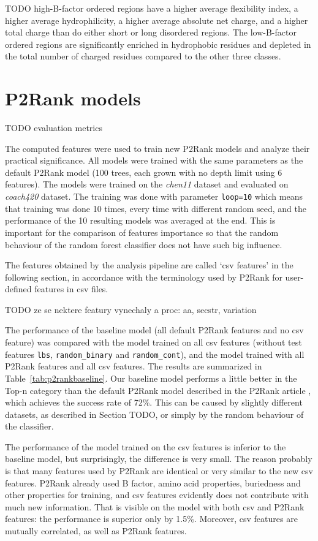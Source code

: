TODO high-B-factor ordered regions
have a higher average flexibility index, a higher average
hydrophilicity, a higher average absolute net charge, and a
higher total charge than do either short or long disordered
regions. The low-B-factor ordered regions are significantly
enriched in hydrophobic residues and depleted in the total
number of charged residues compared to the other three
classes. 




\section{P2Rank models}

TODO evaluation metrics

The computed features were used to train new P2Rank models and analyze their practical significance. All models were trained with the same parameters as the default P2Rank model (100 trees, each grown with no depth limit using 6 features). The models were trained on the \textit{chen11} dataset and evaluated on \textit{coach420} dataset. The training was done with parameter \texttt{loop=10} which means that training was done 10 times, every time with different random seed, and the performance of the 10 resulting models was averaged at the end. This is important for the comparison of features importance so that the random behaviour of the random forest classifier does not have such big influence.

The features obtained by the analysis pipeline are called `csv features' in the following section, in accordance with the terminology used by P2Rank for user-defined features in csv files.

TODO ze se nektere featury vynechaly a proc: aa, secstr, variation

The performance of the baseline model (all default P2Rank features and no csv feature) was compared with the model trained on all csv features (without test features \texttt{lbs}, \texttt{random\_binary} and \texttt{random\_cont}), and the model trained with all P2Rank features and all csv features. The results are summarized in Table~\ref{tab:p2rankbaseline}. Our baseline model performs a little better in the Top-n category than the default P2Rank model described in the P2Rank article \cite{p2rank1}, which achieves the success rate of 72\%. This can be caused by  slightly different datasets, as described in Section TODO, or simply by the random behaviour of the classifier.

The performance of the model trained on the csv features is inferior to the baseline model, but surprisingly, the difference is very small. The reason probably is that many features used by P2Rank are identical or very similar to the new csv features. P2Rank already used B factor, amino acid properties, buriedness and other properties for training, and csv features evidently does not contribute with much new information. That is visible on the model with both csv and P2Rank features: the performance is superior only by 1.5\%. Moreover, csv features are mutually correlated, as well as P2Rank features. 

